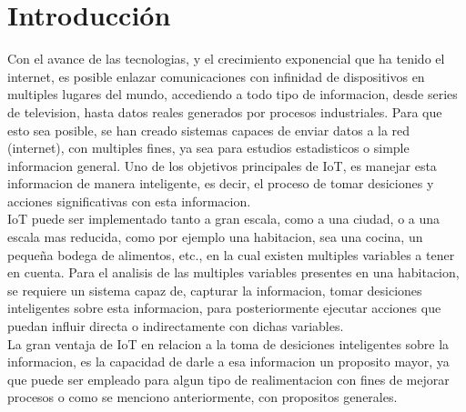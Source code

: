\chapter{Introducción}


Con el avance de las tecnologias, y el crecimiento exponencial que ha tenido el internet, es posible enlazar comunicaciones con infinidad de dispositivos en multiples lugares del mundo, accediendo a todo tipo de informacion, desde series de television, hasta datos reales generados por procesos industriales. Para que esto sea posible, se han creado sistemas capaces de enviar datos a la red (internet), con multiples fines, ya sea para estudios estadisticos o simple informacion general. Uno de los objetivos principales de IoT, es manejar esta informacion de manera inteligente, es decir, el proceso de tomar desiciones y acciones significativas con esta informacion.\\

IoT puede ser implementado tanto a gran escala, como a una ciudad, o a una escala mas reducida, como por ejemplo una habitacion, sea una cocina, un pequeña bodega de alimentos, etc., en la cual existen multiples variables a tener en cuenta. Para el analisis de las multiples variables presentes en una habitacion, se requiere un sistema capaz de, capturar la informacion, tomar desiciones inteligentes sobre esta informacion, para posteriormente ejecutar acciones que puedan influir directa o indirectamente con dichas variables. \\

La gran ventaja de IoT en relacion a la toma de desiciones inteligentes sobre la informacion, es la capacidad de darle a esa informacion un proposito mayor, ya que puede ser empleado para algun tipo de realimentacion con fines de mejorar procesos o como se menciono anteriormente, con propositos generales.